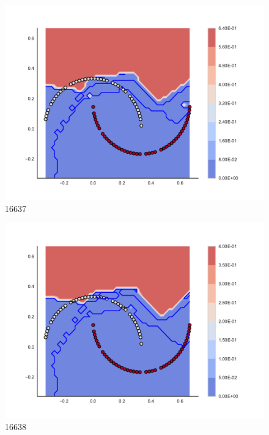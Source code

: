 \begin{subfigure}[b]{0.09\textwidth}
    \includegraphics[clip, trim=2.35cm 1.75cm 4.5cm 0cm,width=\textwidth]{img/convergence/16637.pdf}
    \caption{16637}
    \label{fig:convergence_16637}
\end{subfigure}
%
\begin{subfigure}[b]{0.09\textwidth}
    \includegraphics[clip, trim=2.35cm 1.75cm 4.5cm 0cm,width=\textwidth]{img/convergence/16638.pdf}
    \caption{16638}
    \label{fig:convergence_16638}
\end{subfigure}
%
